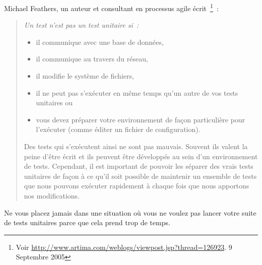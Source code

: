 \documentclass[a4paper,10pt,twoside]{book}
\begin{document}
{\begin{description}

\item[Les règles de Feathers.]
Michael Feathers, un auteur et consultant en processus agile écrit~\footnote{Voir \url{http://www.artima.com/weblogs/viewpost.jsp?thread=126923}. 9 Septembre 2005}~:
\begin{quotation}
\noindent
 {\it
Un test n'est pas un test unitaire si~:
\begin{itemize}
\item il communique avec une base de données,
\item il communique au travers du réseau,
\item il modifie le système de fichiers,
\item il ne peut pas s'exécuter en même temps qu'un autre de vos tests unitaires ou
\item vous devez préparer votre environnement de façon particulière pour l'exécuter (comme éditer un fichier de configuration).
\end{itemize}
Des tests qui s'exécutent ainsi ne sont pas mauvais.   
Souvent ils valent la peine d'être écrit et ils peuvent être développés au sein d'un environnement de tests. 
Cependant, il est important de pouvoir les séparer des vrais tests unitaires de façon à ce qu'il soit possible de maintenir un ensemble de tests que nous pouvons exécuter rapidement à chaque fois que nous apportons nos modifications.
}
\end{quotation}
Ne vous placez jamais dans une situation où vous ne voulez pas lancer votre suite de tests unitaires parce que cela prend trop de temps.

\end{description}}
\end{document}

